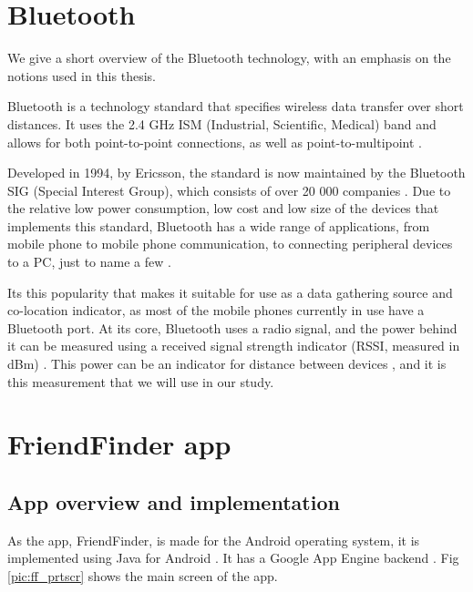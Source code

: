 \section{Bluetooth}
\label{sec:bt}

We give a short overview of the Bluetooth technology, with an emphasis on the notions used in this thesis.    

Bluetooth is a technology standard that specifies wireless data transfer over short distances. It uses the 2.4 GHz ISM (Industrial, Scientific, Medical) band and allows for both point-to-point connections, as well as point-to-multipoint \cite{bluet}. 

Developed in 1994, by Ericsson, the standard is now maintained by the Bluetooth SIG (Special Interest Group), which consists of over 20 000 companies \cite{bloae}. Due to the relative low power consumption, low cost and low size of the devices that implements this standard, Bluetooth has a wide range of applications, from mobile phone to mobile phone communication, to connecting peripheral devices to a PC, just to name a few \cite{bluet}.

Its this popularity that makes it suitable for use as a data gathering source and co-location indicator, as most of the mobile phones currently in use have a Bluetooth port. At its core, Bluetooth uses a radio signal, and the power behind it can be measured using a received signal strength indicator (RSSI, measured in dBm) \cite{sauter2010gsm}. This power can be an indicator for distance between devices \cite{vedran}, and it is this measurement that we will use in our study.  

\section{FriendFinder app}

\subsection{App overview and implementation}

As the app, FriendFinder, is made for the Android operating system, it is implemented using Java for Android \cite{jandroid}. It has a Google App Engine backend \cite{googleapp}. Fig \ref{pic:ff_prtscr} shows the main screen of the app. 

